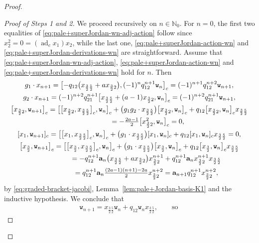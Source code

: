 \documentclass[10pt,a4paper]{amsart}
\numberwithin{equation}{section}
\newcommand{\adc}{\operatorname{ad}_c}
\newcommand{\ab}{\mathbf a}
\newcommand{\N}{{\mathbb N}}
\newcommand{\wt}{\mathtt{w}}
\newcommand{\tresdos}{\frac{3}{2}}
\newcommand{\cincodos}{\frac{5}{2}}
\begin{document}
\begin{proof}
\begin{proof}[Proof of Steps 1 and 2]
We proceed recursively on $n\in\N_0$.
For $n=0$, the first two equalities of \eqref{eq:pale+superJordan-wn-adj-action} follow since $x_2^2=0=(\adc x_1)x_2$, while the last one, \eqref{eq:pale+superJordan-action-wn} and \eqref{eq:pale+superJordan-derivations-wn} are straightforward.
Assume that \eqref{eq:pale+superJordan-wn-adj-action}, \eqref{eq:pale+superJordan-action-wn} and \eqref{eq:pale+superJordan-derivations-wn} hold for $n$. Then
\begin{gather*}
g_1 \cdot x_{n+1} =
\bigl[ -q_{12}\big(x_{\tresdos\cincodos}+ax_{\tresdos2}\big), (-1)^nq_{12}^{n+1} \wt_n \bigr]_c
= (-1)^{n+1}q_{12}^{n+2} \wt_{n+1},
\\
g_2 \cdot x_{n+1} =
(-1)^{n+2}q_{21}^{n+1} \big[ x_{\tresdos\cincodos}+(a-1)x_{\tresdos2}, \wt_n \big]_c
= (-1)^{n+2}q_{21}^{n+1} \wt_{n+1},
\\
\big[x_{\tresdos2},\wt_{n+1}\big]_c = \big[ \big[x_{\tresdos2}, x_{\tresdos\cincodos}\big]_c, \wt_n \big]_c
+\big(g_1g_2 \cdot x_{\tresdos\cincodos}\big) \big[x_{\tresdos2}, \wt_n \big]_c
+q_{12}\big[x_{\tresdos2}, \wt_n \big]_c x_{\tresdos\cincodos}
\\ \hphantom{[x_{\tresdos2},\wt_{n+1}]_c }
 {} = -\tfrac{2a-1}{2} \big[ x_{\tresdos2}^2, \wt_n \big]_c=0,
\\
[x_1,\wt_{n+1}]_c = \big[ \big[ x_1, x_{\tresdos\cincodos}\big]_c, \wt_n \big]_c
+\big(g_1 \cdot x_{\tresdos\cincodos}\big) [x_1, \wt_n ]_c
+q_{12}[x_1, \wt_n ]_c x_{\tresdos\cincodos} =0,
\\
\big[x_{\tresdos},\wt_{n+1}\big]_c = \big[ \big[ x_{\tresdos}, x_{\tresdos\cincodos}\big]_c, \wt_n \big]_c
+\big(g_1 \cdot x_{\tresdos\cincodos}\big) \big[x_{\tresdos}, \wt_n \big]_c
+q_{12}\big[x_{\tresdos}, \wt_n \big]_c x_{\tresdos\cincodos}
\\ \hphantom{[x_{\tresdos},\wt_{n+1}]_c}
{} =
-q_{12}^{n+1}\ab_n \big(x_{\tresdos\cincodos}+ax_{\tresdos2}\big)x_{\tresdos2}^{n+1}
+q_{12}^{n+1}\ab_n x_{\tresdos2}^{n+1}x_{\tresdos\cincodos}
\\ \hphantom{[x_{\tresdos},\wt_{n+1}]_c}
{} = q_{12}^{n+1}\ab_n \tfrac{(2a-1)(n+1)-2a}{2}x_{\tresdos2}^{n+2} = \ab_{n+1}q_{12}^{n+1} x_{\tresdos2}^{n+2},
\end{gather*}
by \eqref{eq:graded-bracket-jacobi}, Lemma~\ref{lem:pale+Jordan-basis-K1} and the inductive hypothesis.
We conclude that
\begin{align*}
&\wt_{n+1}=x_{\tresdos\cincodos}\wt_n+q_{12}\wt_nx_{\tresdos\cincodos},\qquad \text{so}\quad

\end{align*}
\end{proof}
\end{proof}
\end{document}
